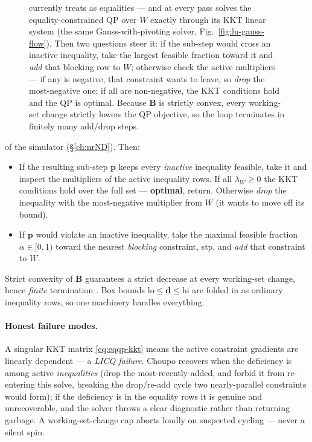 \documentclass[11pt,a4paper]{article}
\newcommand{\dv}{\mathbf{d}}                          %
\newcommand{\Bv}{\mathbf{B}}                          %
\begin{document}
\begin{figure}[ht]
{currently treats as equalities --- and at every pass solves the
equality-constrained QP over $W$ exactly through its KKT linear system
(the same Gauss-with-pivoting solver, Fig.~\ref{fig:lu-gauss-flow}).
Then two questions steer it: if the sub-step would cross an inactive
inequality, take the largest feasible fraction toward it and
\emph{add} that blocking row to $W$; otherwise check the active
multipliers --- if any is negative, that constraint wants to leave, so
\emph{drop} the most-negative one; if all are non-negative, the KKT
conditions hold and the QP is optimal.  Because $\Bv$ is strictly
convex, every working-set change strictly lowers the QP objective, so
the loop terminates in finitely many add/drop steps.}
\label{fig:active-set-qp}
\end{figure}

of the simulator (§\ref{ch:nrND}). Then:
\begin{itemize}
  \item If the resulting sub-step $\mathbf p$ keeps every \emph{inactive}
        inequality feasible, take it and inspect the multipliers of the
        active inequality rows. If all $\lambda_W \ge 0$ the KKT
        conditions hold over the full set --- \textbf{optimal}, return.
        Otherwise \emph{drop} the inequality with the most-negative
        multiplier from $W$ (it wants to move off its bound).
  \item If $\mathbf p$ would violate an inactive inequality, take the
        maximal feasible fraction $\alpha \in [0,1)$ toward the nearest
        \emph{blocking} constraint, stp, and \emph{add} that constraint
        to $W$.
\end{itemize}
Strict convexity of $\Bv$ guarantees a strict decrease at every
working-set change, hence \emph{finite} termination
\cite[Sec.\ 16.5]{NocedalWright}. Box bounds $\mathrm{lo} \le \dv \le
\mathrm{hi}$ are folded in as ordinary inequality rows, so one machinery
handles everything.

\paragraph{Honest failure modes.}
A singular KKT matrix \eqref{eq:eqqp-kkt} means the active constraint
gradients are linearly dependent --- a \emph{LICQ failure}. Choupo
recovers when the deficiency is among active \emph{inequalities} (drop
the most-recently-added, and forbid it from re-entering this solve,
breaking the drop/re-add cycle two nearly-parallel constraints would
form); if the deficiency is in the equality rows it is genuine and
unrecoverable, and the solver throws a clear diagnostic rather than
returning garbage. A working-set-change cap aborts loudly on suspected
cycling --- never a silent spin.
\end{document}
